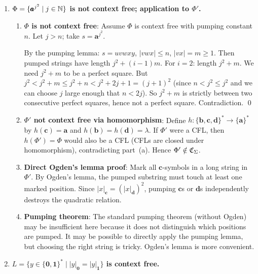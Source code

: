 \begin{enumerate}[{9.}1. ]
For $i=2$: length $= 2^j + m$. We need $2^j + m$ to be a power of 2. But $2^j < 2^j + m \leq 2^j + n < 2^{j+1}$ (since $m \leq n < 2^j$). So $2^j + m$ is strictly between $2^j$ and $2^{j+1}$, which means it is not a power of 2. Contradiction. \qed

\item \textbf{$\Phi = \{\pmb{a}^{j^2} \mid j \in \mathbb{N}\}$ is not context free; application to $\Phi'$.}

\begin{enumerate}
\item \textbf{$\Phi$ is not context free}: Assume $\Phi$ is context free with pumping constant $n$. Let $j > n$; take $s = \pmb{a}^{j^2}$.

By the pumping lemma: $s = uvwxy$, $|vwx| \leq n$, $|vx| = m \geq 1$. Then pumped strings have length $j^2 + (i-1)m$. For $i=2$: length $j^2 + m$. We need $j^2 + m$ to be a perfect square. But $j^2 < j^2 + m \leq j^2 + n < j^2 + 2j + 1 = (j+1)^2$ (since $n < j^2 \leq j^2$ and we can choose $j$ large enough that $n < 2j$). So $j^2 + m$ is strictly between two consecutive perfect squares, hence not a perfect square. Contradiction. \qed

\item \textbf{$\Phi'$ not context free via homomorphism}: Define $h: \{\pmb{b},\pmb{c},\pmb{d}\}^* \to \{\pmb{a}\}^*$ by $h(\pmb{c}) = \pmb{a}$ and $h(\pmb{b}) = h(\pmb{d}) = \lambda$. If $\Phi'$ were a CFL, then $h(\Phi') = \Phi$ would also be a CFL (CFLs are closed under homomorphism), contradicting part~(a). Hence $\Phi' \notin \mathfrak{C}_\Sigma$.

\item \textbf{Direct Ogden's lemma proof}: Mark all $\pmb{c}$-symbols in a long string in $\Phi'$. By Ogden's lemma, the pumped substring must touch at least one marked position. Since $|x|_{\pmb{c}} = (|x|_{\pmb{d}})^2$, pumping $\pmb{c}$s or $\pmb{d}$s independently destroys the quadratic relation.

\item \textbf{Pumping theorem}: The standard pumping theorem (without Ogden) may be insufficient here because it does not distinguish which positions are pumped. It may be possible to directly apply the pumping lemma, but choosing the right string is tricky. Ogden's lemma is more convenient.
\end{enumerate}

\item \textbf{$L = \{y \in \{\pmb{0},\pmb{1}\}^* \mid |y|_{\pmb{0}} = |y|_{\pmb{1}}\}$ is context free.}


\end{enumerate}
